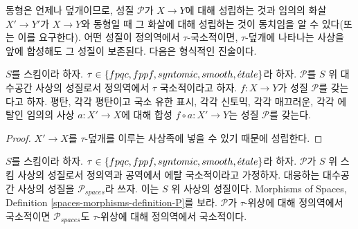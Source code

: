\noindent
동형은 언제나 덮개이므로, 성질 $\mathcal{P}$가 $X\to Y$에 대해
성립하는 것과 임의의 화살 $X'\to Y'$가 $X\to Y$와 동형일 때 그
화살에 대해
성립하는 것이 동치임을 알 수 있다(또는 이를 요구한다). 어떤 성질이
정의역에서 $\tau$-국소적이면, $\tau$-덮개에 나타나는 사상을 앞에
합성해도 그 성질이 보존된다. 다음은 형식적인 진술이다.

\begin{lemma}
\label{lemma-precompose-property-local-source}
$S$를 스킴이라 하자.
$\tau\in\{fpqc,\linebreak[0] fppf,\linebreak[0] syntomic,\linebreak[0]
smooth,\linebreak[0]\etale\}$라 하자. $\mathcal{P}$를 $S$ 위 대수공간
사상의 성질로서 정의역에서 $\tau$ 국소적이라고 하자. $f:X\to Y$가
성질 $\mathcal{P}$를 갖는다고 하자. 평탄, 각각 평탄이고 국소 유한 표시,
각각 신토믹, 각각 매끄러운, 각각 에탈인 임의의 사상 $a:X'\to X$에 대해
합성 $f\circ a:X'\to Y$는 성질 $\mathcal{P}$를 갖는다.
\end{lemma}

\begin{proof}
$X'\to X$를 $\tau$-덮개를 이루는 사상족에 넣을 수 있기 때문에
성립한다.
\end{proof}

\begin{lemma}
\label{lemma-transfer-from-schemes}
$S$를 스킴이라 하자.
$\tau\in\{fpqc,\linebreak[0] fppf,\linebreak[0] syntomic,\linebreak[0]
smooth,\linebreak[0]\etale\}$라 하자. $\mathcal{P}$가 $S$ 위 스킴 사상의
성질로서 정의역과 공역에서 에탈 국소적이라고 가정하자. 대응하는
대수공간 사상의 성질을 $\mathcal{P}_{spaces}$라 쓰자. 이는 $S$ 위
사상의 성질이다.
Morphisms of Spaces, Definition \ref{spaces-morphisms-definition-P}를 보라.
$\mathcal{P}$가 $\tau$-위상에 대해 정의역에서 국소적이면
$\mathcal{P}_{spaces}$도 $\tau$-위상에 대해 정의역에서 국소적이다.
\end{lemma}

